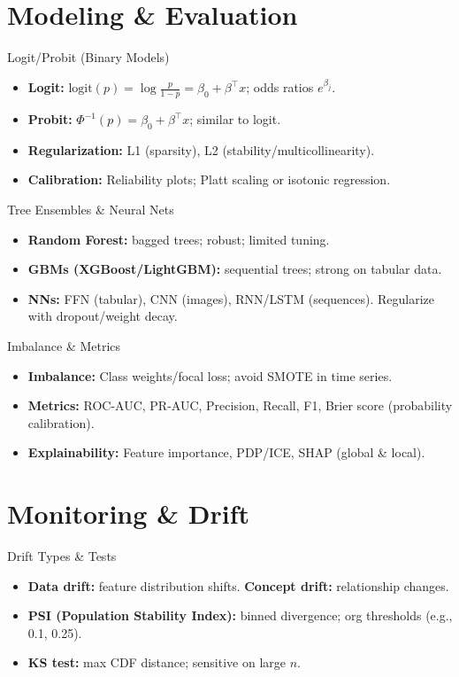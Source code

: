 \documentclass[aspectratio=169]{beamer}
\begin{document}
\section{Modeling \& Evaluation}
\begin{frame}{Logit/Probit (Binary Models)}
  \begin{itemize}
    \item \textbf{Logit:} $\mathrm{logit}(p)=\log\frac{p}{1-p}=\beta_0+\beta^\top x$; odds ratios $e^{\beta_j}$.
    \item \textbf{Probit:} $\Phi^{-1}(p)=\beta_0+\beta^\top x$; similar to logit.
    \item \textbf{Regularization:} L1 (sparsity), L2 (stability/multicollinearity).
    \item \textbf{Calibration:} Reliability plots; Platt scaling or isotonic regression.
  \end{itemize}
\end{frame}

\begin{frame}{Tree Ensembles \& Neural Nets}
  \begin{itemize}
    \item \textbf{Random Forest:} bagged trees; robust; limited tuning.
    \item \textbf{GBMs (XGBoost/LightGBM):} sequential trees; strong on tabular data.
    \item \textbf{NNs:} FFN (tabular), CNN (images), RNN/LSTM (sequences). Regularize with dropout/weight decay.
  \end{itemize}
\end{frame}

\begin{frame}{Imbalance \& Metrics}
  \begin{itemize}
    \item \textbf{Imbalance:} Class weights/focal loss; avoid SMOTE in time series.
    \item \textbf{Metrics:} ROC-AUC, PR-AUC, Precision, Recall, F1, Brier score (probability calibration).
    \item \textbf{Explainability:} Feature importance, PDP/ICE, SHAP (global \& local).
  \end{itemize}
\end{frame}

\section{Monitoring \& Drift}
\begin{frame}{Drift Types \& Tests}
  \begin{itemize}
    \item \textbf{Data drift:} feature distribution shifts. \textbf{Concept drift:} relationship changes.
    \item \textbf{PSI (Population Stability Index):} binned divergence; org thresholds (e.g., 0.1, 0.25).
    \item \textbf{KS test:} max CDF distance; sensitive on large $n$.
  \end{itemize}
\end{frame}
\end{document}
